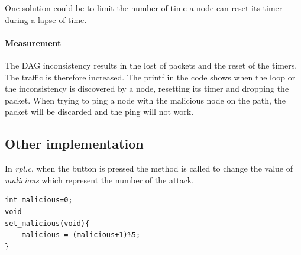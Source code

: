 \documentclass{report}
\begin{document}
One solution could be to limit the number of time a node can reset its timer during a lapse of time. 


\paragraph{Measurement}
The DAG inconsistency results in the lost of packets and the reset of
the timers. The traffic is therefore increased. The printf in the code
shows when the loop or the inconsistency is discovered by a node,
resetting its timer and dropping the packet. When trying to ping a node
with the malicious node on the path, the packet will be discarded and
the ping will not work. 

\subsection{Other implementation}
In \textit{rpl.c}, when the button is pressed the method is called to
change the value of \textit{malicious} which represent the number of the
attack.

\begin{lstlisting}
int malicious=0;
void
set_malicious(void){
	malicious = (malicious+1)%5;
}
\end{lstlisting}
\end{document}

